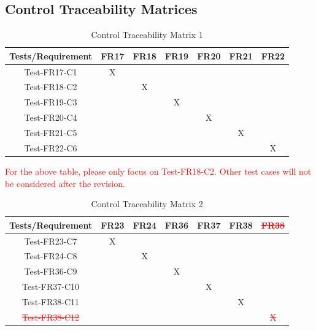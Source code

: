 \documentclass[12pt, titlepage]{article}
\begin{document}
\subsection{Control Traceability Matrices}
\begin{table}[htp]
\centering
\caption{Control Traceability Matrix 1}
\begin{tabular}{|c|c|c|c|c|c|c|}
\hline
Tests/Requirement & FR17 & FR18 & FR19 & FR20 & FR21 & FR22 \\
\hline
Test-FR17-C1      & X    &      &      &      &      &      \\
\hline
Test-FR18-C2      &      & X    &      &      &      &      \\
\hline
Test-FR19-C3      &      &      & X    &      &      &      \\
\hline
Test-FR20-C4      &      &      &      & X    &      &      \\
\hline
Test-FR21-C5      &      &      &      &      & X    &      \\
\hline
Test-FR22-C6      &      &      &      &      &      & X   \\
\hline
\end{tabular}
\end{table}
\noindent \textcolor{red}{For the above table, please only focus on Test-FR18-C2. Other test
cases will not be considered after the revision.}
\begin{table}[htp]
\centering
\caption{Control Traceability Matrix 2}
\begin{tabular}{|c|c|c|c|c|c|c|}
\hline
Tests/Requirement & FR23 & FR24 & FR36 & FR37 & FR38 & \textcolor{red}{\st{FR38}} \\
\hline
Test-FR23-C7      & X    &      &        &      &      &      \\
\hline
Test-FR24-C8      &      & X    &        &      &      &      \\
\hline
Test-FR36-C9    &      &      & X      &      &      &      \\
\hline
Test-FR37-C10     &      &      &        & X    &      &      \\
\hline
Test-FR38-C11     &      &      &        &      & X    &      \\
\hline
\textcolor{red}{\st{Test-FR38-C12}}     &      &      &        &      &      & \textcolor{red}{\st{X}}   \\
\hline
\end{tabular}
\end{table}
\newpage
\end{document}
